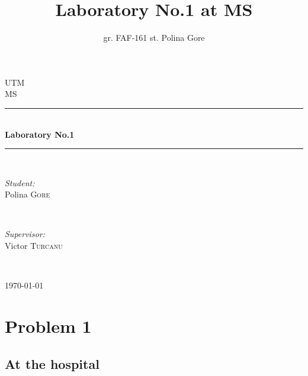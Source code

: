 \documentclass{article}
\title{Laboratory No.1 at MS}
\author{gr. FAF-161 st. Polina Gore}
\begin{document}
  \begin{titlepage}

    \newcommand{\HRule}{\rule{\linewidth}{0.5mm}} %

    \center %

    \textsc{\LARGE UTM}\\[1.5cm] %
    \textsc{\Large MS}\\[0.5cm] %

    \HRule \\[0.4cm]
    { \huge \bfseries Laboratory No.1}\\[0.4cm] %
    \HRule \\[1.5cm]

    \begin{minipage}{0.4\textwidth}
      \begin{flushleft} \large
        \emph{Student:}\\
        Polina \textsc{Gore} %
      \end{flushleft}
    \end{minipage}
    ~
    \begin{minipage}{0.4\textwidth}
      \begin{flushright} \large
        \emph{Supervisor:} \\
        Victor \textsc{Turcanu} %
      \end{flushright}
    \end{minipage}\\[4cm]

    \vfill
    
    {\large \today}\\[3cm]

  \end{titlepage}


  \newpage

  \section{Problem 1}

    \subsection{At the hospital}
\end{document}
